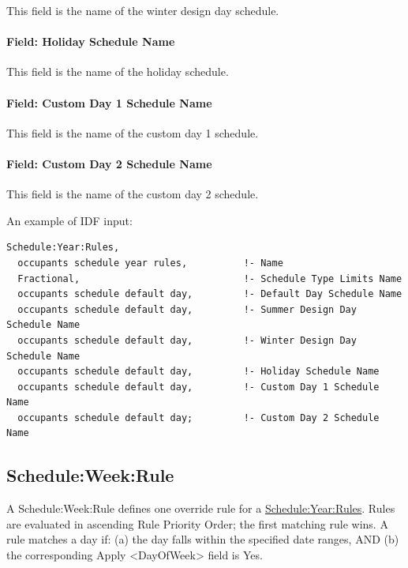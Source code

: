 This field is the name of the winter design day schedule.

\paragraph{Field: Holiday Schedule Name}\label{field-holiday-schedule-name-scheduleyearrules}

This field is the name of the holiday schedule.

\paragraph{Field: Custom Day 1 Schedule Name}\label{field-custom-day-1-schedule-name-scheduleyearrules}

This field is the name of the custom day 1 schedule.

\paragraph{Field: Custom Day 2 Schedule Name}\label{field-custom-day-2-schedule-name-scheduleyearrules}

This field is the name of the custom day 2 schedule.

An example of IDF input:

\begin{lstlisting}
Schedule:Year:Rules,
  occupants schedule year rules,          !- Name
  Fractional,                             !- Schedule Type Limits Name
  occupants schedule default day,         !- Default Day Schedule Name
  occupants schedule default day,         !- Summer Design Day Schedule Name
  occupants schedule default day,         !- Winter Design Day Schedule Name
  occupants schedule default day,         !- Holiday Schedule Name
  occupants schedule default day,         !- Custom Day 1 Schedule Name
  occupants schedule default day;         !- Custom Day 2 Schedule Name
\end{lstlisting}

\subsection{Schedule:Week:Rule}\label{scheduleweekrule}

A Schedule:Week:Rule defines one override rule for a \hyperref[scheduleyearrules]{Schedule:Year:Rules}.
Rules are evaluated in ascending Rule Priority Order; the first matching rule wins.
A rule matches a day if: (a) the day falls within the specified date ranges, AND (b) the corresponding Apply <DayOfWeek> field is Yes.

